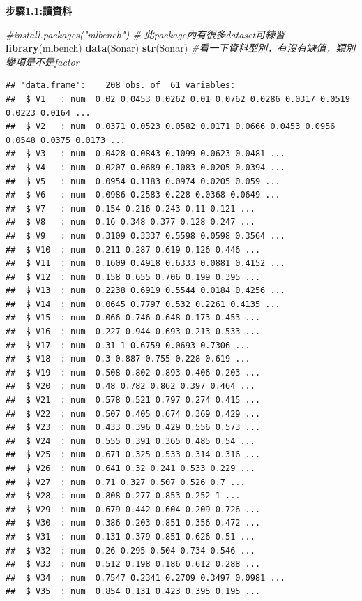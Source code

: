 \documentclass[
]{book}
\newenvironment{Shaded}{\begin{snugshade}}{\end{snugshade}}
\newcommand{\CommentTok}[1]{\textcolor[rgb]{0.56,0.35,0.01}{\textit{#1}}}
\newcommand{\KeywordTok}[1]{\textcolor[rgb]{0.13,0.29,0.53}{\textbf{#1}}}
\newcommand{\NormalTok}[1]{#1}
\begin{document}
\textbf{步驟1.1:讀資料}

\begin{Shaded}
\begin{Highlighting}[]
\CommentTok{#install.packages("mlbench") # 此package內有很多dataset可練習}
\KeywordTok{library}\NormalTok{(mlbench)}
\KeywordTok{data}\NormalTok{(Sonar)}
\KeywordTok{str}\NormalTok{(Sonar) }\CommentTok{#看一下資料型別，有沒有缺值，類別變項是不是factor}
\end{Highlighting}
\end{Shaded}

\begin{verbatim}
## 'data.frame':	208 obs. of  61 variables:
##  $ V1   : num  0.02 0.0453 0.0262 0.01 0.0762 0.0286 0.0317 0.0519 0.0223 0.0164 ...
##  $ V2   : num  0.0371 0.0523 0.0582 0.0171 0.0666 0.0453 0.0956 0.0548 0.0375 0.0173 ...
##  $ V3   : num  0.0428 0.0843 0.1099 0.0623 0.0481 ...
##  $ V4   : num  0.0207 0.0689 0.1083 0.0205 0.0394 ...
##  $ V5   : num  0.0954 0.1183 0.0974 0.0205 0.059 ...
##  $ V6   : num  0.0986 0.2583 0.228 0.0368 0.0649 ...
##  $ V7   : num  0.154 0.216 0.243 0.11 0.121 ...
##  $ V8   : num  0.16 0.348 0.377 0.128 0.247 ...
##  $ V9   : num  0.3109 0.3337 0.5598 0.0598 0.3564 ...
##  $ V10  : num  0.211 0.287 0.619 0.126 0.446 ...
##  $ V11  : num  0.1609 0.4918 0.6333 0.0881 0.4152 ...
##  $ V12  : num  0.158 0.655 0.706 0.199 0.395 ...
##  $ V13  : num  0.2238 0.6919 0.5544 0.0184 0.4256 ...
##  $ V14  : num  0.0645 0.7797 0.532 0.2261 0.4135 ...
##  $ V15  : num  0.066 0.746 0.648 0.173 0.453 ...
##  $ V16  : num  0.227 0.944 0.693 0.213 0.533 ...
##  $ V17  : num  0.31 1 0.6759 0.0693 0.7306 ...
##  $ V18  : num  0.3 0.887 0.755 0.228 0.619 ...
##  $ V19  : num  0.508 0.802 0.893 0.406 0.203 ...
##  $ V20  : num  0.48 0.782 0.862 0.397 0.464 ...
##  $ V21  : num  0.578 0.521 0.797 0.274 0.415 ...
##  $ V22  : num  0.507 0.405 0.674 0.369 0.429 ...
##  $ V23  : num  0.433 0.396 0.429 0.556 0.573 ...
##  $ V24  : num  0.555 0.391 0.365 0.485 0.54 ...
##  $ V25  : num  0.671 0.325 0.533 0.314 0.316 ...
##  $ V26  : num  0.641 0.32 0.241 0.533 0.229 ...
##  $ V27  : num  0.71 0.327 0.507 0.526 0.7 ...
##  $ V28  : num  0.808 0.277 0.853 0.252 1 ...
##  $ V29  : num  0.679 0.442 0.604 0.209 0.726 ...
##  $ V30  : num  0.386 0.203 0.851 0.356 0.472 ...
##  $ V31  : num  0.131 0.379 0.851 0.626 0.51 ...
##  $ V32  : num  0.26 0.295 0.504 0.734 0.546 ...
##  $ V33  : num  0.512 0.198 0.186 0.612 0.288 ...
##  $ V34  : num  0.7547 0.2341 0.2709 0.3497 0.0981 ...
##  $ V35  : num  0.854 0.131 0.423 0.395 0.195 ...

\end{verbatim}
\end{document}

